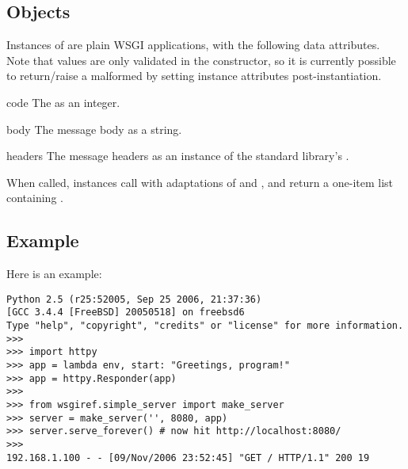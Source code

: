 \subsection{ Objects \label{response}}

Instances of  are plain WSGI applications, with the
following data attributes. Note that values are only validated in the
constructor, so it is currently possible to return/raise a malformed
 by setting instance attributes post-instantiation.

\begin{datadesc}{code}
The  as an integer.
\end{datadesc}

\begin{datadesc}{body}
The message body as a string.
\end{datadesc}

\begin{datadesc}{headers}
The message headers as an instance of the standard library's
.
\end{datadesc}

When called,  instances call  with
adaptations of  and , and return a one-item list
containing .


\subsection{Example \label{example}}

Here is an example:

\begin{verbatim}
Python 2.5 (r25:52005, Sep 25 2006, 21:37:36)
[GCC 3.4.4 [FreeBSD] 20050518] on freebsd6
Type "help", "copyright", "credits" or "license" for more information.
>>>
>>> import httpy
>>> app = lambda env, start: "Greetings, program!"
>>> app = httpy.Responder(app)
>>>
>>> from wsgiref.simple_server import make_server
>>> server = make_server('', 8080, app)
>>> server.serve_forever() # now hit http://localhost:8080/
>>>
192.168.1.100 - - [09/Nov/2006 23:52:45] "GET / HTTP/1.1" 200 19
\end{verbatim}